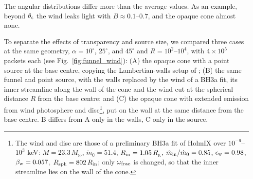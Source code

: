 The angular distributions differ more than the average values.
As an example, beyond $\theta_{\rm c}$ the wind leaks light with $B \approx 0.1$--$0.7$, and the opaque cone almost none.

To separate the effects of transparency and source size, we compared three cases at the same geometry, $\alpha = 10^\circ$, $25^\circ$,  and $45^\circ$ and $R = 10^2$--$10^4$, with $4\times10^5$ packets each (see Fig.~\ref{fig:funnel_wind}): (A) the opaque cone with a point source at the base centre, copying the Lambertian-walls setup of \citet{Ahlberg2026}; (B) the same funnel and point source, with the walls replaced by the wind of a BH3a fit, its inner streamline along the wall of the cone and the wind cut at the spherical distance $R$ from the base centre; and (C) the opaque cone with extended emission from wind photosphere and disc\footnote{
The wind and disc are those of a preliminary BH3a fit of HolmIX over $10^{-6}$–$10^3$ keV: $M = 23.3\,M_\odot$, $\dot m_0 = 51.4$, $R_{\rm in} = 1.05\,R_{\rm g}$, $\dot m_{\rm in}/\dot m_0 = 0.85$, $\epsilon_{\rm w} = 0.98$, $\beta_{\rm w} = 0.057$, $R_{\rm sph} = 802\,R_{\rm in}$; only $\omega_{\rm frac}$ is changed, so that the inner streamline lies on the wall of the cone.}, put on the wall at the same distance from the base centre.
B differs from A only in the walls, C only in the source.

